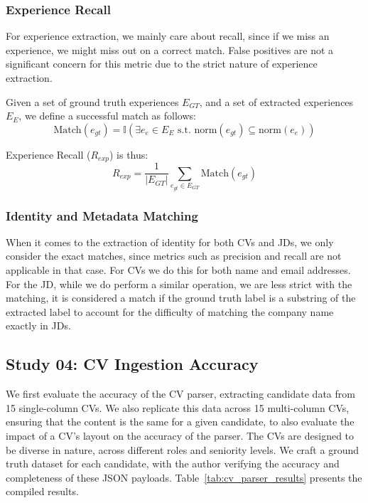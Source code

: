 \subsubsection{Experience Recall}
For experience extraction, we mainly care about recall, since if we miss an experience, we might miss out on a
correct match. False positives are not a significant concern for this metric due to the strict nature of experience
extraction.

Given a set of ground truth experiences $E_{GT}$, and a set of extracted experiences $E_E$, we define a
successful match as follows:
\begin{equation}
    \text{Match}(e_{gt}) = \mathbb{I}\left(\exists e_e \in E_E \text{ s.t. } \text{norm}(e_{gt}) \subseteq \text{norm}(e_e)\right)
\end{equation}

Experience Recall ($R_{exp}$) is thus:
\begin{equation}
    R_{exp} = \frac{1}{|E_{GT}|} \sum_{e_{gt} \in E_{GT}} \text{Match}(e_{gt})
\end{equation}

\subsubsection{Identity and Metadata Matching}
When it comes to the extraction of identity for both CVs and JDs, we only consider the exact matches, since
metrics such as precision and recall are not applicable in that case. For CVs we do this for both name and 
email addresses. For the JD, while we do perform a similar operation, we are less strict with the matching,
it is considered a match if the ground truth label is a substring of the extracted label to account for the 
difficulty of matching the company name exactly in JDs.

\subsection{Study 04: CV Ingestion Accuracy}
\label{subsec:study-04}

We first evaluate the accuracy of the CV parser, extracting candidate data from 15 single-column CVs. We also
replicate this data across 15 multi-column CVs, ensuring that the content is the same for a given candidate,
to also evaluate the impact of a CV's layout on the accuracy of the parser. The CVs are designed to be diverse
in nature, across different roles and seniority levels. We craft a ground truth dataset for each candidate,
with the author verifying the accuracy and completeness of these JSON payloads.
Table~\ref{tab:cv_parser_results} presents the compiled results.

